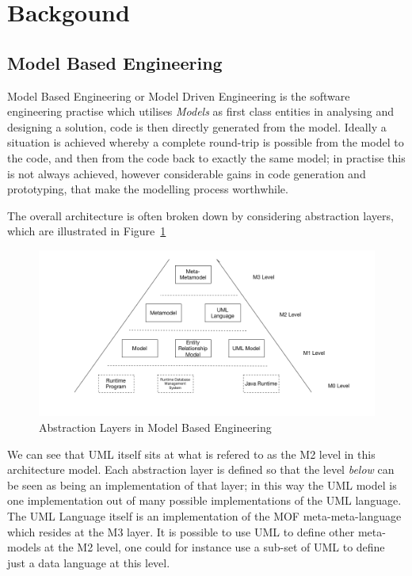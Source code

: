 \documentclass{llncs}
\begin{document}
\section{Backgound}

\subsection{Model Based Engineering}
Model Based Engineering or Model Driven Engineering is the software engineering practise which utilises \emph{Models} as first class entities in analysing and designing a solution, code is then directly generated from the model. Ideally a situation is achieved whereby a complete round-trip is possible from the model to the code, and then from the code back to exactly the same model; in practise this is not always achieved, however considerable gains in code generation and prototyping, that make the modelling process worthwhile.

The overall architecture is often broken down by considering abstraction layers, which are illustrated in Figure~\ref{fig:mbe1}
\begin{figure}[h]
\includegraphics[width=1.0\textwidth,natwidth=610,natheight=642]{Models1}
\caption{Abstraction Layers in Model Based Engineering} 
\label{fig:mbe1}
\end{figure}
We can see that UML itself sits at what is refered to as the M2 level in this architecture model. Each abstraction layer is defined so that the level \emph{below} can be seen as being an implementation of that layer; in this way the UML model is one implementation out of many possible implementations of the UML language. The UML Language itself is an implementation of the MOF meta-meta-language which resides at the M3 layer. It is possible to use UML to define other meta-models at the M2 level, one could for instance use a sub-set of UML to define just a data language at this level.
\end{document}
